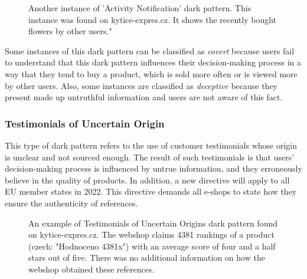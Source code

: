 \begin{figure}[ht]
\begin{minipage}[ht]{0.40\linewidth}
                        \caption{Another instance of 'Activity Notification' dark pattern. This instance was found on kytice-expres.cz. It shows the recently bought flowers by other users."}
                        \label{fig:pressured-selling-czc}
                    \end{minipage}
                \end{figure}
        
                Some instances of this dark pattern can be classified as \emph{covert} because users fail to understand that this dark pattern influences their decision-making process in a way that they tend to buy a product, which is sold more often or is viewed more by other users. Also, some instances are classified as \emph{deceptive} because they present made up untruthful information and users are not aware of this fact.
        
                \subsubsection{Testimonials of Uncertain Origin}
                This type of dark pattern refers to the use of customer testimonials whose origin is unclear and not sourced enough. The result of such testimonials is that users' decision-making process is influenced by untrue information, and they erroneously believe in the quality of products. In addition, a new directive will apply to all EU member states in 2022. This directive demands all e-shops to state how they ensure the authenticity of references\cite{penize-testimonials}.
                
                \begin{figure}[ht]
                    \centering
                    \caption{An example of Testimonials of Uncertain Origins dark pattern found on kytice-expres.cz. The webshop claims 4381 rankings of a product (czech: "Hodnoceno 4381x") with an average score of four and a half stars out of five. There was no additional information on how the webshop obtained these references.}
                    \label{fig:testimonials-kytice-expres}
                \end{figure}
        

